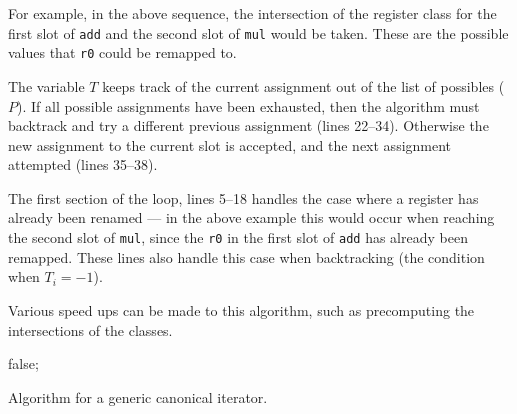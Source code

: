 \documentclass{article}
\begin{document}
For example, in the above sequence, the intersection of the register class for the first slot of \texttt{add} and the second slot of \texttt{mul} would be taken. These are the possible values that \texttt{r0} could be remapped to.

The variable $T$ keeps track of the current assignment out of the list of possibles ($P$). If all possible assignments have been exhausted, then the algorithm must backtrack and try a different previous assignment (lines 22--34). Otherwise the new assignment to the current slot is accepted, and the next assignment attempted (lines 35--38).

The first section of the loop, lines 5--18 handles the case where a register has already been renamed --- in the above example this would occur when reaching the second slot of \texttt{mul}, since the \texttt{r0} in the first slot of \texttt{add} has already been remapped. These lines also handle this case when backtracking (the condition when $T_i=-1$).

Various speed ups can be made to this algorithm, such as precomputing the intersections of the classes.


\begin{algorithm}
    \Return false;
\caption{Algorithm for a generic canonical iterator.}
\label{alg:generic_canonical}
\end{algorithm}
\end{document}
